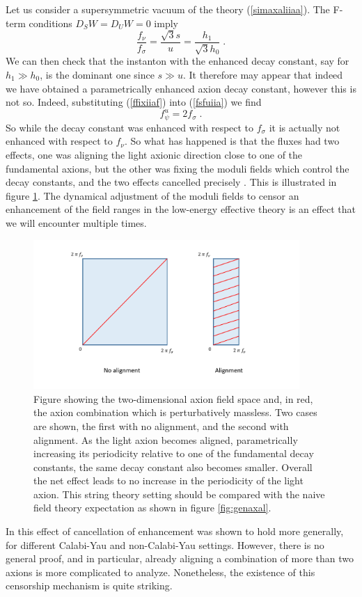 \documentclass[11pt,a4paper]{article}
\numberwithin{equation}{section}
\numberwithin{table}{section}\setlength{\multlinegap}{25pt}
\newcommand{\be}{\begin{equation}}
\newcommand{\ee}{\end{equation}}
\begin{document}
Let us consider a supersymmetric vacuum of the theory (\ref{simaxaliiaa}). The F-term conditions $D_SW=D_UW=0$ imply
\be
\frac{f_{\nu}}{f_{\sigma}}  = \frac{\sqrt{3}s}{u} = \frac{h_1}{\sqrt{3}h_0} \;.
\label{ffixiiaf}
\ee
We can then check that the instanton with the enhanced decay constant, say for $h_1 \gg h_0$, is the dominant one since $s \gg u$. It therefore may appear that indeed we have obtained a parametrically enhanced axion decay constant, however this is not so. Indeed, substituting (\ref{ffixiiaf}) into (\ref{fsfuiia}) we find 
\be
f_{\psi}^u = 2 f_{\sigma}\;.
\ee
So while the decay constant was enhanced with respect to $f_{\sigma}$ it is actually not enhanced with respect to $f_{\nu}$. So what has happened is that the fluxes had two effects, one was aligning the light axionic direction close to one of the fundamental axions, but the other was fixing the moduli fields which control the decay constants, and the two effects cancelled precisely \cite{Palti:2015xra}. This is illustrated in figure \ref{fig:iiaaxal}. The dynamical adjustment of the moduli fields to censor an enhancement of the field ranges in the low-energy effective theory is an effect that we will encounter multiple times. 
\begin{figure}[t]
\centering
 \includegraphics[width=0.9\textwidth]{axaligiia.pdf}
\caption{Figure showing the two-dimensional axion field space and, in red, the axion combination which is perturbatively massless. Two cases are shown, the first with no alignment, and the second with alignment. As the light axion becomes aligned, parametrically increasing its periodicity relative to one of the fundamental decay constants, the same decay constant also becomes smaller. Overall the net effect leads to no increase in the periodicity of the light axion. This string theory setting should be compared with the naive field theory expectation as shown in figure \ref{fig:genaxal}.}
\label{fig:iiaaxal}
\end{figure}
In \cite{Palti:2015xra,Baume:2016psm} this effect of cancellation of enhancement was shown to hold more generally, for different Calabi-Yau and non-Calabi-Yau settings. However, there is no general proof, and in particular, already aligning a combination of more than two axions is more complicated to analyze. Nonetheless, the existence of this censorship mechanism is quite striking.
\end{document}
